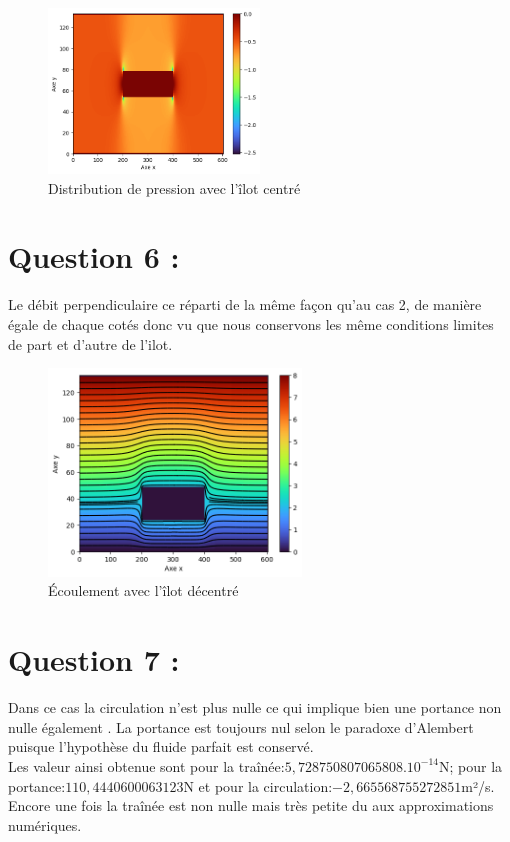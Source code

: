 \documentclass{article}
\begin{document}
 \begin{figure}[h]
        \centering
        \includegraphics[width=0.5\textwidth]{"../pictures/pressure2.png"}
        \caption{Distribution de pression avec l'îlot centré   }
    \end{figure}


\section*{Question 6 :}
Le débit perpendiculaire ce réparti de la même façon qu'au cas 2, de manière égale de chaque cotés donc vu que nous conservons les même conditions limites de part et d'autre de l'ilot.
\begin{figure}[h]
        \centering
        \includegraphics[width=0.6\textwidth]{"../pictures/stream3.png"}
        \caption{  Écoulement avec l'îlot décentré  }
    \end{figure}


\pagebreak
\section*{Question 7 :}

Dans ce cas la circulation n'est plus nulle ce qui implique bien une portance non nulle également . La portance est toujours nul selon le paradoxe d'Alembert puisque l'hypothèse du fluide parfait est conservé.\\ Les valeur ainsi obtenue sont pour la traînée:$ 5,728750807065808.10^{-14}$N; pour la portance:$110,4440600063123$N et pour la circulation:$-2,665568755272851$m²/s.
Encore une fois la traînée est non nulle mais très petite du aux approximations numériques.
\end{document}
